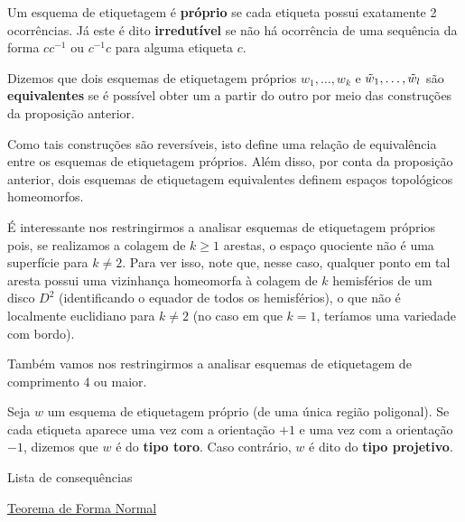 \begin{defi}
    Um esquema de etiquetagem é \textbf{próprio} se cada etiqueta possui exatamente 2 ocorrências. Já este é dito \textbf{irredutível} se não há ocorrência de uma sequência da forma $c c^{-1}$ ou $c^{-1} c$ para alguma etiqueta $c$.
    
    Dizemos que dois esquemas de etiquetagem próprios $w_1,\ldots,w_k$ e $\Tilde{w}_1,\ldots,\Tilde{w}_l$ são \textbf{equivalentes} se é possível obter um a partir do outro por meio das construções da proposição anterior.
\end{defi}

Como tais construções são reversíveis, isto define uma relação de equivalência entre os esquemas de etiquetagem próprios. Além disso, por conta da proposição anterior, dois esquemas de etiquetagem equivalentes definem espaços topológicos homeomorfos.

É interessante nos restringirmos a analisar esquemas de etiquetagem próprios pois, se realizamos a colagem de $k\geq 1$ arestas, o espaço quociente não é uma superfície para $k\neq 2$. Para ver isso, note que, nesse caso, qualquer ponto em tal aresta possui uma vizinhança homeomorfa à colagem de $k$ hemisférios de um disco $D^2$ (identificando o equador de todos os hemisférios), o que não é localmente euclidiano para $k\neq 2$ (no caso em que $k=1$, teríamos uma variedade com bordo).

Também vamos nos restringirmos a analisar esquemas de etiquetagem de comprimento $4$ ou maior.

\begin{defi}
    Seja $w$ um esquema de etiquetagem próprio (de uma única região poligonal). Se cada etiqueta aparece uma vez com a orientação $+1$ e uma vez com a orientação $-1$, dizemos que $w$ é do \textbf{tipo toro}. Caso contrário, $w$ é dito do \textbf{tipo projetivo}.
\end{defi}

\begin{titlemize}{Lista de consequências}
	\item \hyperref[forma-normal-thm]{Teorema de Forma Normal}
\end{titlemize}